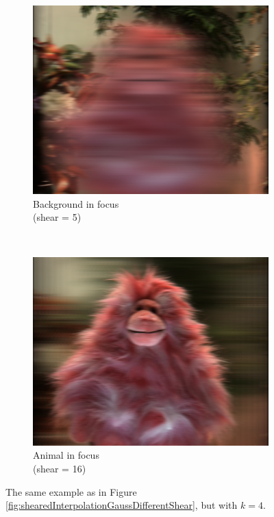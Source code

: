 \documentclass[a4paper]{article}
\begin{document}
\begin{figure}[ht]
	\begin{subfigure}[h]{0.48\textwidth}
	  \includegraphics[width=\textwidth]{shearedGauss_k1_shear5_sighor4_sigvert5}
	  \caption*{Background in focus \\(shear = 5)}
	\end{subfigure}
    	~
	\begin{subfigure}[h]{0.48\textwidth}
	  \includegraphics[width=\textwidth]{shearedGauss_k1_shear16_sighor4_sigvert5}
	  \caption*{Animal in focus \\(shear = 16)}
	\end{subfigure}
\caption{The same example as in Figure \ref{fig:shearedInterpolationGaussDifferentShear}, but with $k=4$.}
\label{fig:shearedInterpolationGaussDifferentK}
\end{figure}
\end{document}
